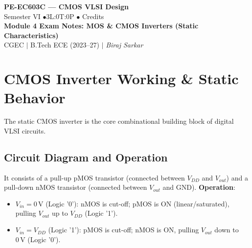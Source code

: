 \documentclass[12pt,a4paper]{article}
\begin{document}

\begin{center}
  {\LARGE\bfseries\color{myred} PE-EC603C --- CMOS VLSI Design}\\[5pt]
  {\normalsize\color{mydark} Semester VI \quad$\bullet$\quad 3L:0T:0P \quad$\bullet$ Credits}\\[3pt]
  {\normalsize\color{myteal}\textbf{Module 4 Exam Notes: MOS \& CMOS Inverters (Static Characteristics)}}\\[3pt]
  {\small\color{mydark} CGEC \;$|$\; B.Tech ECE (2023--27) \;$|$\; \textit{Biraj Sarkar}}
\end{center}
\vspace{2pt}
\noindent{\color{myred}\rule{\linewidth}{1.5pt}}
\vspace{2pt}

\hypersetup{linkcolor=mydark}
\tableofcontents
\hypersetup{linkcolor=myteal}
\newpage

\section{CMOS Inverter Working \& Static Behavior}

The static CMOS inverter is the core combinational building block of digital VLSI circuits.

\subsection{Circuit Diagram and Operation}
It consists of a pull-up pMOS transistor (connected between $V_{DD}$ and $V_{out}$) and a pull-down nMOS transistor (connected between $V_{out}$ and GND).
\textbf{Operation}:
\begin{itemize}[leftmargin=*, itemsep=3.5pt]
  \item $V_{in} = 0\,\text{V}$ (Logic '0'): nMOS is cut-off; pMOS is ON (linear/saturated), pulling $V_{out}$ up to $V_{DD}$ (Logic '1').
  \item $V_{in} = V_{DD}$ (Logic '1'): pMOS is cut-off; nMOS is ON, pulling $V_{out}$ down to $0\,\text{V}$ (Logic '0').
\end{itemize}
\end{document}
